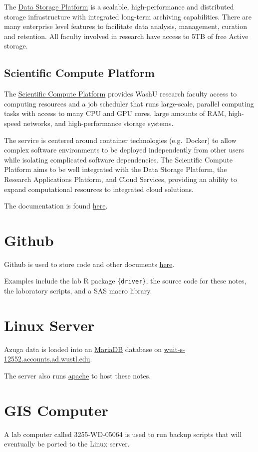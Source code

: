 \documentclass[
]{book}
\begin{document}
The \href{https://ris.wustl.edu/services/research-storage/}{Data Storage Platform} is a scalable, high-performance and distributed storage infrastructure with integrated long-term archiving capabilities. There are many enterprise level features to facilitate data analysis, management, curation and retention. All faculty involved in research have access to 5TB of free Active storage.

\hypertarget{scientific-compute-platform}{%
\subsection{Scientific Compute Platform}\label{scientific-compute-platform}}

The \href{https://ris.wustl.edu/services/compute/}{Scientific Compute Platform} provides WashU research faculty access to computing resources and a job scheduler that runs large-scale, parallel computing tasks with access to many CPU and GPU cores, large amounts of RAM, high-speed networks, and high-performance storage systems.

The service is centered around container technologies (e.g.~Docker) to allow complex software environments to be deployed independently from other users while isolating complicated software dependencies. The Scientific Compute Platform aims to be well integrated with the Data Storage Platform, the Research Applications Platform, and Cloud Services, providing an ability to expand computational resources to integrated cloud solutions.

The documentation is found \href{https://docs.ris.wustl.edu/}{here}.

\hypertarget{github}{%
\section{Github}\label{github}}

Github is used to store code and other documents \href{https://github.com/DrivesLabWustl}{here}.

Examples include the lab R package \texttt{\{driver\}}, the source code for these notes, the laboratory scripts, and a SAS macro library.

\hypertarget{linux-server}{%
\section{Linux Server}\label{linux-server}}

Azuga data is loaded into an \href{https://mariadb.org/}{MariaDB} database on \href{https://wuit-s-12552.accounts.ad.wustl.edu}{wuit-s-12552.accounts.ad.wustl.edu}.

The server also runs \href{https://httpd.apache.org/}{apache} to host these notes.

\hypertarget{gis-computer}{%
\section{GIS Computer}\label{gis-computer}}

A lab computer called 3255-WD-05064 is used to run backup scripts that will eventually be ported to the Linux server.

  
\end{document}
